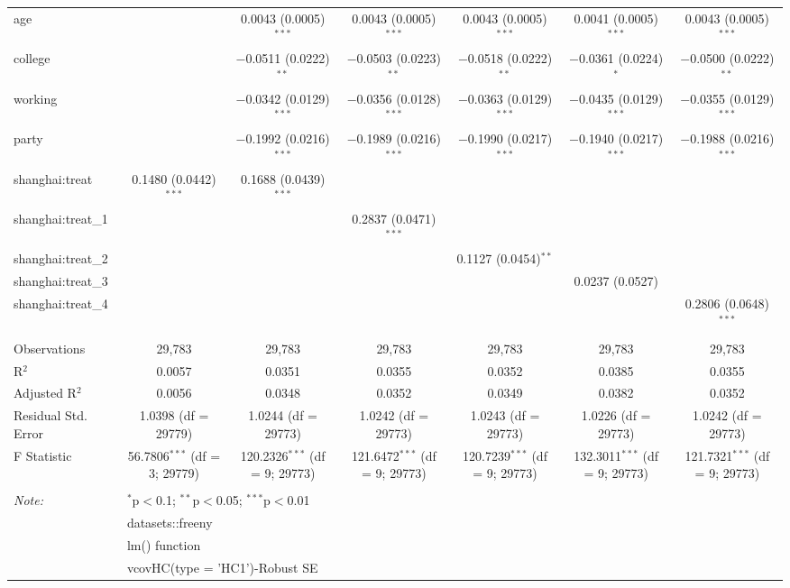 \documentclass[
]{article}
\begin{document}
\begin{table}[!htbp]
\begin{tabular}{@{\extracolsep{5pt}}lcccccc}
  age &  & 0.0043 (0.0005)$^{***}$ & 0.0043 (0.0005)$^{***}$ & 0.0043 (0.0005)$^{***}$ & 0.0041 (0.0005)$^{***}$ & 0.0043 (0.0005)$^{***}$ \\ 
  college &  & $-$0.0511 (0.0222)$^{**}$ & $-$0.0503 (0.0223)$^{**}$ & $-$0.0518 (0.0222)$^{**}$ & $-$0.0361 (0.0224)$^{*}$ & $-$0.0500 (0.0222)$^{**}$ \\ 
  working &  & $-$0.0342 (0.0129)$^{***}$ & $-$0.0356 (0.0128)$^{***}$ & $-$0.0363 (0.0129)$^{***}$ & $-$0.0435 (0.0129)$^{***}$ & $-$0.0355 (0.0129)$^{***}$ \\ 
  party &  & $-$0.1992 (0.0216)$^{***}$ & $-$0.1989 (0.0216)$^{***}$ & $-$0.1990 (0.0217)$^{***}$ & $-$0.1940 (0.0217)$^{***}$ & $-$0.1988 (0.0216)$^{***}$ \\ 
  shanghai:treat & 0.1480 (0.0442)$^{***}$ & 0.1688 (0.0439)$^{***}$ &  &  &  &  \\ 
  shanghai:treat\_1 &  &  & 0.2837 (0.0471)$^{***}$ &  &  &  \\ 
  shanghai:treat\_2 &  &  &  & 0.1127 (0.0454)$^{**}$ &  &  \\ 
  shanghai:treat\_3 &  &  &  &  & 0.0237 (0.0527) &  \\ 
  shanghai:treat\_4 &  &  &  &  &  & 0.2806 (0.0648)$^{***}$ \\ 
 \hline \\[-1.8ex] 
Observations & 29,783 & 29,783 & 29,783 & 29,783 & 29,783 & 29,783 \\ 
R$^{2}$ & 0.0057 & 0.0351 & 0.0355 & 0.0352 & 0.0385 & 0.0355 \\ 
Adjusted R$^{2}$ & 0.0056 & 0.0348 & 0.0352 & 0.0349 & 0.0382 & 0.0352 \\ 
Residual Std. Error & 1.0398 (df = 29779) & 1.0244 (df = 29773) & 1.0242 (df = 29773) & 1.0243 (df = 29773) & 1.0226 (df = 29773) & 1.0242 (df = 29773) \\ 
F Statistic & 56.7806$^{***}$ (df = 3; 29779) & 120.2326$^{***}$ (df = 9; 29773) & 121.6472$^{***}$ (df = 9; 29773) & 120.7239$^{***}$ (df = 9; 29773) & 132.3011$^{***}$ (df = 9; 29773) & 121.7321$^{***}$ (df = 9; 29773) \\ 
\hline 
\hline \\[-1.8ex] 
\textit{Note:}  & \multicolumn{6}{l}{$^{*}$p$<$0.1; $^{**}$p$<$0.05; $^{***}$p$<$0.01} \\ 
 & \multicolumn{6}{l}{datasets::freeny} \\ 
 & \multicolumn{6}{l}{lm() function} \\ 
 & \multicolumn{6}{l}{vcovHC(type = 'HC1')-Robust SE} \\ 
\end{tabular} 
\end{table}
\end{document}
